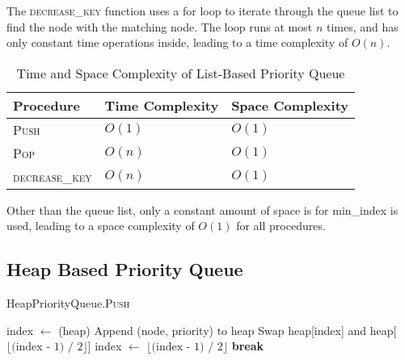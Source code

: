 \documentclass[12pt]{article}
\begin{document}
The \textsc{decrease\_key} function uses a for loop to iterate through
the queue list to find the node with the matching node. The loop runs
at most $n$ times, and has only constant time operations inside, leading
to a time complexity of $O(n)$.

\newpage

\begin{table}[H]
    \centering
    \begin{threeparttable}
        \caption{Time and Space Complexity of List-Based Priority Queue}
        \begin{tabular*}{0.8\textwidth}{@{\extracolsep{\fill}}lll@{}}
            \toprule
            \textbf{Procedure} & \textbf{Time Complexity} & \textbf{Space Complexity} \\ \midrule
            \textsc{Push}      & $O(1)$                  & $O(1)$                    \\
            \textsc{Pop}       & $O(n)$                  & $O(1)$                    \\
            \textsc{decrease\_key} & $O(n)$              & $O(1)$                    \\
            \bottomrule
        \end{tabular*}
    \end{threeparttable}
\end{table}

Other than the queue list, only a constant amount of space is for min\_index
is used, leading to a space complexity of $O(1)$ for all procedures.

\newpage

\subsection{Heap Based Priority Queue}

\begin{algorithm}[H]
    \caption{HeapPriorityQueue.\textsc{Push}}
    \begin{algorithmic}[1]
        \State index $\gets$ (heap)
        \State Append (node, priority) to heap
         
                \State Swap heap[index] and heap[$\lfloor \text{(index - 1) / 2} \rfloor$]
                \State index $\gets$ $\lfloor \text{(index - 1) / 2} \rfloor$
            \Else
                \State \textbf{break}
            \EndIf
        \EndWhile
    \end{algorithmic}
\end{algorithm}
\end{document}
